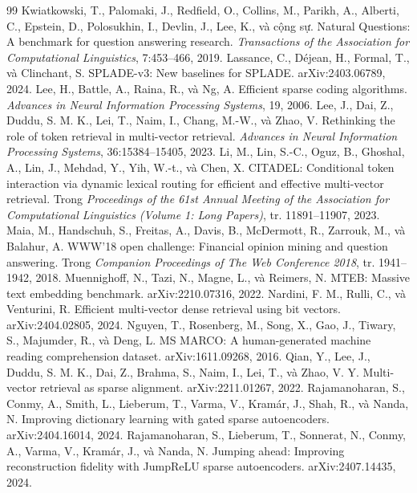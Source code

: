 \documentclass[a4paper,13pt]{extreport}
\theoremstyle{plain}
\begin{document}
\begin{thebibliography}{99}
 Kwiatkowski, T., Palomaki, J., Redfield, O., Collins, M., Parikh, A., Alberti, C., Epstein, D., Polosukhin, I., Devlin, J., Lee, K., và cộng sự. Natural Questions: A benchmark for question answering research. \emph{Transactions of the Association for Computational Linguistics}, 7:453--466, 2019.
 Lassance, C., Déjean, H., Formal, T., và Clinchant, S. SPLADE-v3: New baselines for SPLADE. arXiv:2403.06789, 2024.
 Lee, H., Battle, A., Raina, R., và Ng, A. Efficient sparse coding algorithms. \emph{Advances in Neural Information Processing Systems}, 19, 2006.
 Lee, J., Dai, Z., Duddu, S. M. K., Lei, T., Naim, I., Chang, M.-W., và Zhao, V. Rethinking the role of token retrieval in multi-vector retrieval. \emph{Advances in Neural Information Processing Systems}, 36:15384--15405, 2023.
 Li, M., Lin, S.-C., Oguz, B., Ghoshal, A., Lin, J., Mehdad, Y., Yih, W.-t., và Chen, X. CITADEL: Conditional token interaction via dynamic lexical routing for efficient and effective multi-vector retrieval. Trong \emph{Proceedings of the 61st Annual Meeting of the Association for Computational Linguistics (Volume 1: Long Papers)}, tr. 11891--11907, 2023.
 Maia, M., Handschuh, S., Freitas, A., Davis, B., McDermott, R., Zarrouk, M., và Balahur, A. WWW'18 open challenge: Financial opinion mining and question answering. Trong \emph{Companion Proceedings of The Web Conference 2018}, tr. 1941--1942, 2018.
 Muennighoff, N., Tazi, N., Magne, L., và Reimers, N. MTEB: Massive text embedding benchmark. arXiv:2210.07316, 2022.
 Nardini, F. M., Rulli, C., và Venturini, R. Efficient multi-vector dense retrieval using bit vectors. arXiv:2404.02805, 2024.
 Nguyen, T., Rosenberg, M., Song, X., Gao, J., Tiwary, S., Majumder, R., và Deng, L. MS MARCO: A human-generated machine reading comprehension dataset. arXiv:1611.09268, 2016.
 Qian, Y., Lee, J., Duddu, S. M. K., Dai, Z., Brahma, S., Naim, I., Lei, T., và Zhao, V. Y. Multi-vector retrieval as sparse alignment. arXiv:2211.01267, 2022.
 Rajamanoharan, S., Conmy, A., Smith, L., Lieberum, T., Varma, V., Kramár, J., Shah, R., và Nanda, N. Improving dictionary learning with gated sparse autoencoders. arXiv:2404.16014, 2024.
 Rajamanoharan, S., Lieberum, T., Sonnerat, N., Conmy, A., Varma, V., Kramár, J., và Nanda, N. Jumping ahead: Improving reconstruction fidelity with JumpReLU sparse autoencoders. arXiv:2407.14435, 2024.

\end{thebibliography}
\end{document}
